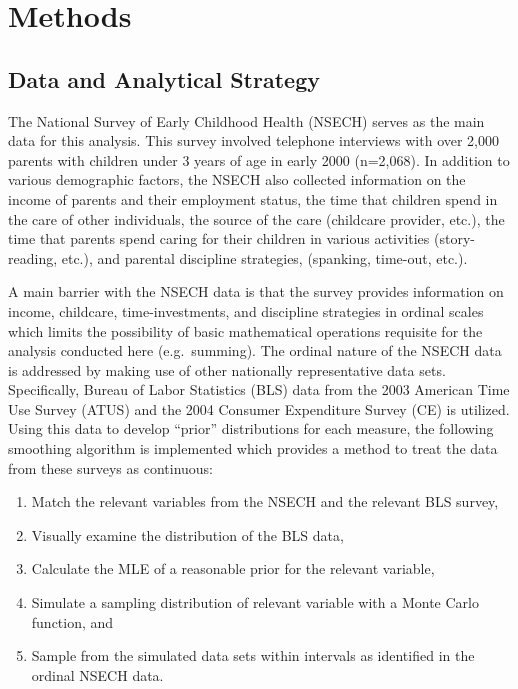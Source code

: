 \documentclass[review]{elsarticle}\usepackage[]{graphicx}\usepackage[]{color}
\begin{document}
\section{Methods}\label{methods}

\subsection{Data and Analytical
Strategy}\label{data-and-analytical-strategy}

The National Survey of Early Childhood Health (NSECH) serves as the main
data for this analysis. This survey involved telephone interviews with
over 2,000 parents with children under 3 years of age in early 2000
(n=2,068). In addition to various demographic factors, the NSECH also
collected information on the income of parents and their employment
status, the time that children spend in the care of other individuals,
the source of the care (childcare provider, etc.), the time that parents
spend caring for their children in various activities (story-reading,
etc.), and parental discipline strategies, (spanking, time-out, etc.).

A main barrier with the NSECH data is that the survey provides
information on income, childcare, time-investments, and discipline
strategies in ordinal scales which limits the possibility of basic
mathematical operations requisite for the analysis conducted here
(e.g.~summing). The ordinal nature of the NSECH data is addressed by
making use of other nationally representative data sets. Specifically,
Bureau of Labor Statistics (BLS) data from the 2003 American Time Use
Survey (ATUS) and the 2004 Consumer Expenditure Survey (CE) is utilized.
Using this data to develop ``prior'' distributions for each measure, the
following smoothing algorithm is implemented which provides a method to
treat the data from these surveys as continuous:

\begin{enumerate}
\def\labelenumi{\arabic{enumi}.}
\itemsep1pt\parskip0pt
\item
  Match the relevant variables from the NSECH and the relevant BLS
  survey,
\item
  Visually examine the distribution of the BLS data,
\item
  Calculate the MLE of a reasonable prior for the relevant variable,
\item
  Simulate a sampling distribution of relevant variable with a Monte
  Carlo function, and
\item
  Sample from the simulated data sets within intervals as identified in
  the ordinal NSECH data.
\end{enumerate}
\end{document}
